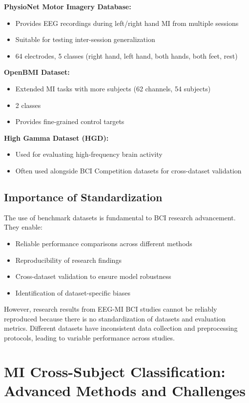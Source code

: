 \documentclass[12pt]{article}
\begin{document}
\textbf{PhysioNet Motor Imagery Database:}
\begin{itemize}
    \item Provides EEG recordings during left/right hand MI from multiple sessions
    \item Suitable for testing inter-session generalization
    \item 64 electrodes, 5 classes (right hand, left hand, both hands, both feet, rest)
\end{itemize}

\textbf{OpenBMI Dataset:}
\begin{itemize}
    \item Extended MI tasks with more subjects (62 channels, 54 subjects)
    \item 2 classes
    \item Provides fine-grained control targets
\end{itemize}

\textbf{High Gamma Dataset (HGD):}
\begin{itemize}
    \item Used for evaluating high-frequency brain activity
    \item Often used alongside BCI Competition datasets for cross-dataset validation
\end{itemize}

\subsection{Importance of Standardization}

The use of benchmark datasets is fundamental to BCI research advancement. They enable:
\begin{itemize}
    \item Reliable performance comparisons across different methods
    \item Reproducibility of research findings
    \item Cross-dataset validation to ensure model robustness
    \item Identification of dataset-specific biases
\end{itemize}

However, research results from EEG-MI BCI studies cannot be reliably reproduced because there is no standardization of datasets and evaluation metrics. Different datasets have inconsistent data collection and preprocessing protocols, leading to variable performance across studies.

\section{MI Cross-Subject Classification: Advanced Methods and Challenges}
\end{document}
